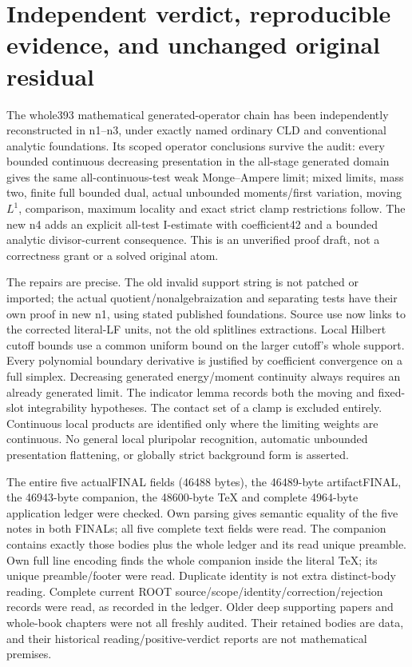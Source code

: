 \documentclass[11pt]{article}
\begin{document}
\section*{Independent verdict, reproducible evidence, and unchanged original residual}

The whole393 mathematical generated-operator chain has been independently reconstructed in n1--n3, under exactly named ordinary CLD and conventional analytic foundations. Its scoped operator conclusions survive the audit: every bounded continuous decreasing presentation in the all-stage generated domain gives the same all-continuous-test weak Monge--Ampere limit; mixed limits, mass two, finite full bounded dual, actual unbounded moments/first variation, moving $L^1$, comparison, maximum locality and exact strict clamp restrictions follow. The new n4 adds an explicit all-test I-estimate with coefficient42 and a bounded analytic divisor-current consequence. This is an unverified proof draft, not a correctness grant or a solved original atom.

The repairs are precise. The old invalid support string is not patched or imported; the actual quotient/nonalgebraization and separating tests have their own proof in new n1, using stated published foundations. Source use now links to the corrected literal-LF units, not the old splitlines extractions. Local Hilbert cutoff bounds use a common uniform bound on the larger cutoff's whole support. Every polynomial boundary derivative is justified by coefficient convergence on a full simplex. Decreasing generated energy/moment continuity always requires an already generated limit. The indicator lemma records both the moving and fixed-slot integrability hypotheses. The contact set of a clamp is excluded entirely. Continuous local products are identified only where the limiting weights are continuous. No general local pluripolar recognition, automatic unbounded presentation flattening, or globally strict background form is asserted.

The entire five actualFINAL fields (46488 bytes), the 46489-byte artifactFINAL, the 46943-byte companion, the 48600-byte TeX and complete 4964-byte application ledger were checked. Own parsing gives semantic equality of the five notes in both FINALs; all five complete text fields were read. The companion contains exactly those bodies plus the whole ledger and its read unique preamble. Own full line encoding finds the whole companion inside the literal TeX; its unique preamble/footer were read. Duplicate identity is not extra distinct-body reading. Complete current ROOT source/scope/identity/correction/rejection records were read, as recorded in the ledger. Older deep supporting papers and whole-book chapters were not all freshly audited. Their retained bodies are data, and their historical reading/positive-verdict reports are not mathematical premises.
\end{document}
